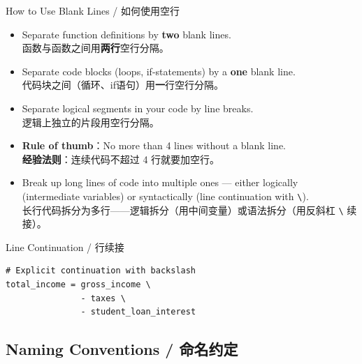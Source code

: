 \documentclass[11pt,a4paper]{report}
\let\oldtexttt\texttt
\renewcommand{\texttt}[1]{\textcolor{mainblue}{\oldtexttt{#1}}}
\begin{document}
\begin{concept}{How to Use Blank Lines / 如何使用空行}
    \begin{itemize}[itemsep=0.5em]
        \item Separate function definitions by \textbf{two} blank lines. \\
        函数与函数之间用\textbf{两行}空行分隔。
        \item Separate code blocks (loops, if-statements) by a \textbf{one} blank line. \\
        代码块之间（循环、if语句）用\textbf{一}行空行分隔。
        \item Separate logical segments in your code by line breaks. \\
        逻辑上独立的片段用空行分隔。
        \item \textbf{Rule of thumb}：No more than 4 lines without a blank line. \\
        \textbf{经验法则}：连续代码不超过 4 行就要加空行。
        \item Break up long lines of code into multiple ones — either logically (intermediate variables) or syntactically (line continuation with \texttt{\textbackslash}). \\
        长行代码拆分为多行——逻辑拆分（用中间变量）或语法拆分（用反斜杠 \texttt{\textbackslash} 续接）。
    \end{itemize}
\end{concept}

\begin{examplebox}{Line Continuation / 行续接}
\begin{lstlisting}
# Explicit continuation with backslash
total_income = gross_income \
               - taxes \
               - student_loan_interest
\end{lstlisting}
\end{examplebox}

\subsection{Naming Conventions / 命名约定}
\end{document}
